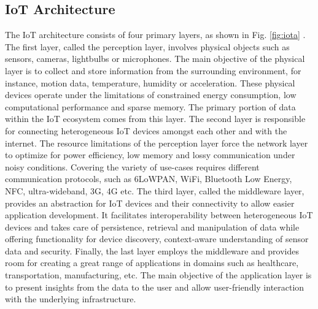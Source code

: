 \documentclass[conference, 11pt]{IEEEtran}
\begin{document}
    \subsection{IoT Architecture}
    The IoT architecture consists of four primary layers, as shown in Fig. \ref{fig:iota} \cite{article:9}.
    The first layer, called the perception layer, involves physical objects such as sensors, cameras, lightbulbs or microphones.
    The main objective of the physical layer is to collect and store information from the surrounding environment, for instance, motion data, temperature, humidity or acceleration.
    These physical devices operate under the limitations of constrained energy consumption, low computational performance and sparse memory.
    The primary portion of data within the IoT ecosystem comes from this layer.
    The second layer is responsible for connecting heterogeneous IoT devices amongst each other and with the internet.
    The resource limitations of the perception layer force the network layer to optimize for power efficiency, low memory and lossy communication under noisy conditions.
    Covering the variety of use-cases requires different communication protocols, such as 6LoWPAN, WiFi, Bluetooth Low Energy, NFC, ultra-wideband, 3G, 4G etc.
    The third layer, called the middleware layer, provides an abstraction for IoT devices and their connectivity to allow easier application development.
    It facilitates interoperability between heterogeneous IoT devices and takes care of persistence, retrieval and manipulation of data while offering functionality for device discovery, context-aware understanding of sensor data and security.
    Finally, the last layer employs the middleware and provides room for creating a great range of applications in domains such as healthcare, transportation, manufacturing, etc.
    The main objective of the application layer is to present insights from the data to the user and allow user-friendly interaction with the underlying infrastructure.
\end{document}
